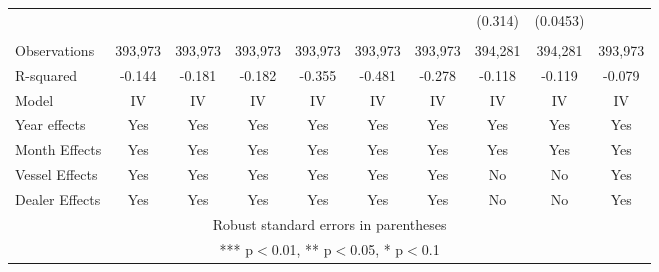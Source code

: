 \begin{tabular}{lccccccccc}
 &  &  &  &  &  &  & (0.314) & (0.0453) &  \\
 &  &  &  &  &  &  &  &  &  \\
Observations & 393,973 & 393,973 & 393,973 & 393,973 & 393,973 & 393,973 & 394,281 & 394,281 & 393,973 \\
R-squared & -0.144 & -0.181 & -0.182 & -0.355 & -0.481 & -0.278 & -0.118 & -0.119 & -0.079 \\
Model & IV & IV & IV & IV & IV & IV & IV & IV & IV \\
Year effects & Yes & Yes & Yes & Yes & Yes & Yes & Yes & Yes & Yes \\
Month Effects & Yes & Yes & Yes & Yes & Yes & Yes & Yes & Yes & Yes \\
Vessel Effects & Yes & Yes & Yes & Yes & Yes & Yes & No & No & Yes \\
 Dealer Effects & Yes & Yes & Yes & Yes & Yes & Yes & No & No & Yes \\ \hline
\multicolumn{10}{c}{ Robust standard errors in parentheses} \\
\multicolumn{10}{c}{ *** p$<$0.01, ** p$<$0.05, * p$<$0.1} \\
\end{tabular}
